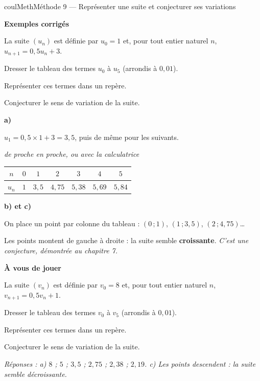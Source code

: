 \documentclass[11pt,a4paper]{article}
\makeatletter
\newcommand{\lycee@gradx}[1]{\foreach \k/\l in {#1}{%
  \draw (\k,0.07)--(\k,-0.07) node[below,font=\scriptsize,inner sep=1.5pt]{$\l$};}}
\newcommand{\lycee@grady}[1]{\foreach \k/\l in {#1}{%
  \draw (0.07,\k)--(-0.07,\k) node[left,font=\scriptsize,inner sep=1.5pt]{$\l$};}}
\providecommand{\gradx}{\lycee@gradx}%
\providecommand{\grady}{\lycee@grady}%
\newcounter{lycee@signet}
\newcommand{\signet}[3][]{\stepcounter{lycee@signet}%
  \edef\lycee@dest{\if\relax\detokenize{#1}\relax
    signet.\arabic{lycee@signet}\else#1\fi}%
  \hypertarget{\lycee@dest}{}\bookmark[level=#2,dest=\lycee@dest]{#3}}
\newcommand{\res}[1]{#1}
\newcounter{methode}
\newenvironment{methodebox}[1][Méthode]{\stepcounter{methode}%
  \begin{boitecours}[phantom={\signet[methode-\arabic{methode}]{2}{#1}}]{coulMeth}{#1}}%
  {\end{boitecours}}
\newcommand{\etape}[1]{\par\smallskip\textbf{\color{coulMeth}#1}\par\nobreak\smallskip}
\newcommand{\reponse}[1]{\par\smallskip
  {\footnotesize\itshape\color{black!55}Réponses : #1}}
\newcommand{\explique}[2]{\par\smallskip\noindent
  \begin{minipage}[t]{0.57\linewidth}\raggedright #1\end{minipage}\hfill
  \begin{minipage}[t]{0.40\linewidth}\raggedright\leavevmode
    {\small\itshape\color{black!60}#2}\end{minipage}\par}
\newcommand{\cas}[1]{\par\smallskip\noindent\textbf{\color{coulExo}#1}\vadjust{\nobreak}}
\newenvironment{correction}{\par}{\par}
\newcommand{\etapeexemples}{\etape{Exemples corrigés}}
\makeatother
\begin{document}
\begin{methodebox}[Méthode 9 --- Représenter une suite et conjecturer ses variations]
\etapeexemples
La suite $(u_{n})$ est définie par $u_{0}=1$ et, pour tout entier naturel $n$,
$u_{n+1}=0{,}5u_{n}+3$.
\begin{questions}[label=\alph*)]
  \item Dresser le tableau des termes $u_{0}$ à $u_{5}$ (arrondis à $0{,}01$).
  \item Représenter ces termes dans un repère.
  \item Conjecturer le sens de variation de la suite.
\end{questions}
\begin{correction}
\cas{a)}
\explique{$u_{1}=0{,}5\times 1+3=3{,}5$, puis de même pour les suivants.}{de proche en
proche, ou avec la calculatrice}
\begin{center}
\renewcommand{\arraystretch}{1.3}
\begin{tabular}{|c|*{6}{c|}}
\hline
$n$ & $0$ & $1$ & $2$ & $3$ & $4$ & $5$\\\hline
$u_{n}$ & $1$ & $3{,}5$ & $4{,}75$ & $5{,}38$ & $5{,}69$ & $5{,}84$\\\hline
\end{tabular}
\end{center}
\cas{b) et c)}\par\nopagebreak
\begin{minipage}[c]{0.58\linewidth}\raggedright
On place un point par colonne du tableau : $(0\,;1)$, $(1\,;3{,}5)$,
$(2\,;4{,}75)$\dots

\smallskip
Les points montent de gauche à droite : la suite semble \textbf{\res{croissante}}.
{\small\itshape\color{black!60}C'est une conjecture, démontrée au chapitre 7.}
\end{minipage}\hfill
\begin{minipage}[c]{0.38\linewidth}\centering
{}
\end{minipage}
\end{correction}

\etape{À vous de jouer}
La suite $(v_{n})$ est définie par $v_{0}=8$ et, pour tout entier naturel $n$,
$v_{n+1}=0{,}5v_{n}+1$.
\begin{questions}[label=\alph*)]
  \item Dresser le tableau des termes $v_{0}$ à $v_{5}$ (arrondis à $0{,}01$).
  \item Représenter ces termes dans un repère.
  \item Conjecturer le sens de variation de la suite.
\end{questions}
\reponse{a) $8$ ; $5$ ; $3{,}5$ ; $2{,}75$ ; $2{,}38$ ; $2{,}19$.\; c) Les points
descendent : la suite semble décroissante.}
\end{methodebox}
\end{document}
